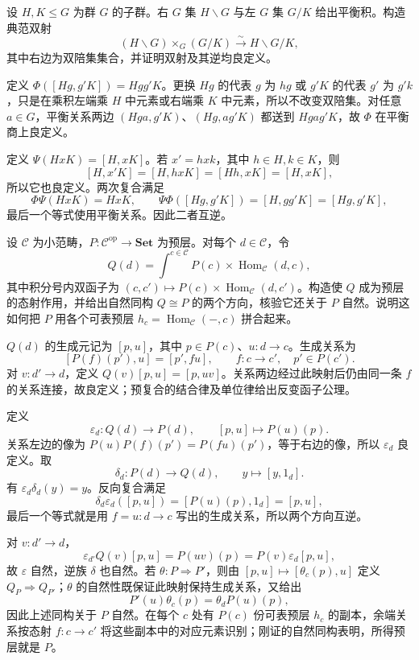 \begin{optionalexercise}\label{b4:ex:03-balanced-double-cosets}
	设 \(H,K\le G\) 为群 \(G\) 的子群。右 \(G\) 集 \(H\backslash G\) 与左 \(G\) 集 \(G/K\) 给出平衡积。构造典范双射
	\[
		(H\backslash G)\times_G(G/K)
		\xrightarrow{\sim}H\backslash G/K,
	\]
	其中右边为双陪集集合，并证明双射及其逆均良定义。
\end{optionalexercise}
\begin{solution}
	定义 \(\Phi([Hg,g'K])=Hgg'K\)。更换 \(Hg\) 的代表 \(g\) 为 \(hg\) 或 \(g'K\) 的代表 \(g'\) 为 \(g'k\)，只是在乘积左端乘 \(H\) 中元素或右端乘 \(K\) 中元素，所以不改变双陪集。对任意 \(a\in G\)，平衡关系两边 \((Hga,g'K)\)、\((Hg,ag'K)\) 都送到 \(Hga g'K\)，故 \(\Phi\) 在平衡商上良定义。

	定义 \(\Psi(HxK)=[H,xK]\)。若 \(x'=hxk\)，其中 \(h\in H,k\in K\)，则
	\[
		[H,x'K]=[H,hxK]=[Hh,xK]=[H,xK],
	\]
	所以它也良定义。两次复合满足
	\[
		\Phi\Psi(HxK)=HxK,\qquad
		\Psi\Phi([Hg,g'K])=[H,gg'K]=[Hg,g'K],
	\]
	最后一个等式使用平衡关系。因此二者互逆。
\end{solution}

\begin{optionalexercise}\label{b4:ex:03-presheaf-coend-density}
	设 \(\mathcal C\) 为小范畴，\(P:\mathcal C^{\mathrm{op}}\rightarrow\mathbf{Set}\) 为预层。对每个 \(d\in\mathcal C\)，令
	\[
		Q(d)=\int^{c\in\mathcal C}
		P(c)\times\operatorname{Hom}_{\mathcal C}(d,c),
	\]
	其中积分号内双函子为 \((c,c')\mapsto P(c)\times\operatorname{Hom}_{\mathcal C}(d,c')\)。构造使 \(Q\) 成为预层的态射作用，并给出自然同构 \(Q\cong P\) 的两个方向，核验它还关于 \(P\) 自然。说明这如何把 \(P\) 用各个可表预层 \(h_c=\operatorname{Hom}_{\mathcal C}(-,c)\) 拼合起来。
\end{optionalexercise}
\begin{solution}
	\(Q(d)\) 的生成元记为 \([p,u]\)，其中 \(p\in P(c)\)、\(u:d\rightarrow c\)。生成关系为
	\[
		[P(f)(p'),u]=[p',fu],
		\qquad f:c\rightarrow c',\quad p'\in P(c').
	\]
	对 \(v:d'\rightarrow d\)，定义 \(Q(v)[p,u]=[p,uv]\)。关系两边经过此映射后仍由同一条 \(f\) 的关系连接，故良定义；预复合的结合律及单位律给出反变函子公理。

	定义
	\[
		\varepsilon_d:Q(d)\longrightarrow P(d),
		\qquad [p,u]\longmapsto P(u)(p).
	\]
	关系左边的像为 \(P(u)P(f)(p')=P(fu)(p')\)，等于右边的像，所以 \(\varepsilon_d\) 良定义。取
	\[
		\delta_d:P(d)\longrightarrow Q(d),\qquad
		y\longmapsto[y,1_d].
	\]
	有 \(\varepsilon_d\delta_d(y)=y\)。反向复合满足
	\[
		\delta_d\varepsilon_d([p,u])
		=[P(u)(p),1_d]=[p,u],
	\]
	最后一个等式就是用 \(f=u:d\rightarrow c\) 写出的生成关系，所以两个方向互逆。

	对 \(v:d'\rightarrow d\)，
	\[
		\varepsilon_{d'}Q(v)[p,u]
		=P(uv)(p)=P(v)\varepsilon_d[p,u],
	\]
	故 \(\varepsilon\) 自然，逆族 \(\delta\) 也自然。若 \(\theta:P\Rightarrow P'\)，则由 \([p,u]\mapsto[\theta_c(p),u]\) 定义 \(Q_P\Rightarrow Q_{P'}\)；\(\theta\) 的自然性既保证此映射保持生成关系，又给出
	\[
		P'(u)\theta_c(p)=\theta_dP(u)(p),
	\]
	因此上述同构关于 \(P\) 自然。在每个 \(c\) 处有 \(P(c)\) 份可表预层 \(h_c\) 的副本，余端关系按态射 \(f:c\rightarrow c'\) 将这些副本中的对应元素识别；刚证的自然同构表明，所得预层就是 \(P\)。
\end{solution}

